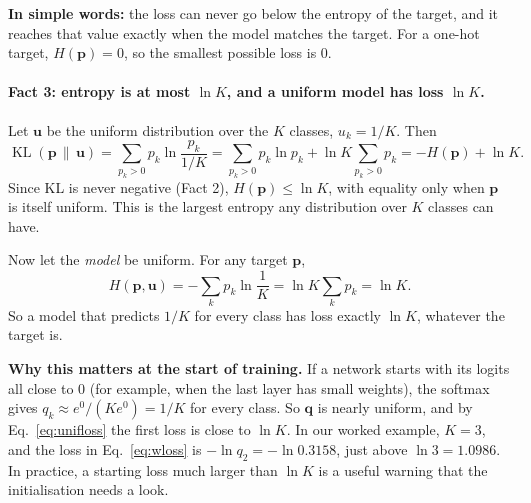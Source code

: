 \documentclass[12pt]{article}
\numberwithin{equation}{section} %
\newcommand{\lnThree}{1.0986}
\newcommand{\pTrue}{0.3158}
\newcommand{\vc}[1]{\symbf{#1}}
\begin{document}
\textbf{In simple words:} the loss can never go below the entropy of
the target, and it reaches that value exactly when the model matches
the target. For a one-hot target, $H(\vc{p}) = 0$, so the smallest
possible loss is $0$.

\paragraph{Fact 3: entropy is at most $\ln K$, and a uniform model has
loss $\ln K$.}
Let $\vc{u}$ be the uniform distribution over the $K$ classes,
$u_k = 1/K$. Then
\begin{equation}
  \operatorname{KL}(\vc{p}\,\|\,\vc{u})
  = \sum_{p_k>0} p_k \ln\frac{p_k}{1/K}
  = \sum_{p_k>0} p_k \ln p_k + \ln K \sum_{p_k>0} p_k
  = -H(\vc{p}) + \ln K.
  \label{eq:klunif}
\end{equation}
Since KL is never negative (Fact 2), $H(\vc{p}) \le \ln K$, with
equality only when $\vc{p}$ is itself uniform. This is the largest
entropy any distribution over $K$ classes can have.

Now let the \emph{model} be uniform. For any target $\vc{p}$,
\begin{equation}
  H(\vc{p},\vc{u}) = -\sum_{k} p_k \ln\frac{1}{K}
  = \ln K \sum_{k} p_k = \ln K.
  \label{eq:unifloss}
\end{equation}
So a model that predicts $1/K$ for every class has loss exactly
$\ln K$, whatever the target is.

\textbf{Why this matters at the start of training.} If a network
starts with its logits all close to $0$ (for example, when the last
layer has small weights), the softmax gives
$q_k \approx e^0 / (K e^0) = 1/K$ for every class. So $\vc{q}$ is
nearly uniform, and by Eq.~\eqref{eq:unifloss} the first loss is
close to $\ln K$. In our worked example, $K = 3$, and the loss in
Eq.~\eqref{eq:wloss} is $-\ln q_2 = -\ln \pTrue$, just above
$\ln 3 = \lnThree$. In practice, a starting loss much larger than
$\ln K$ is a useful warning that the initialisation needs a look.
\end{document}
